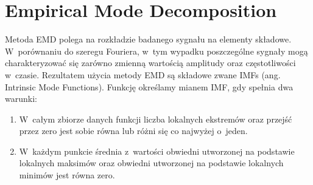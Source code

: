 \section{Empirical Mode Decomposition}
\indent

Metoda EMD polega na rozkładzie badanego sygnału na elementy składowe.
W~porównaniu do szeregu Fouriera, w~tym wypadku poszczególne sygnały mogą
charakteryzować się zarówno zmienną wartością amplitudy oraz częstotliwości
w~czasie. Rezultatem użycia metody EMD są składowe zwane IMFs (ang. Intrinsic
Mode Functions). Funkcję określamy mianem IMF, gdy spełnia dwa warunki:
\begin{enumerate}[1.]
    \item W~całym zbiorze danych funkcji liczba lokalnych ekstremów oraz przejść
    przez zero jest sobie równa lub różni się co najwyżej o~jeden.
    \item W~każdym punkcie średnia z~wartości obwiedni utworzonej na podstawie
    lokalnych maksimów oraz obwiedni utworzonej na podstawie lokalnych minimów
    jest równa zero.
\end{enumerate}

